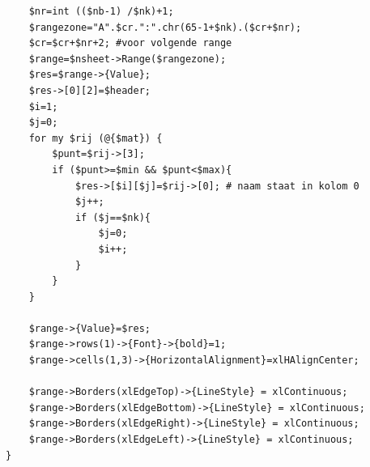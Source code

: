 \documentclass[11pt,a4paper]{report}
\begin{document}
\begin{enumerate}[resume]
\begin{lstlisting}
	$nr=int (($nb-1) /$nk)+1;
	$rangezone="A".$cr.":".chr(65-1+$nk).($cr+$nr);
	$cr=$cr+$nr+2; #voor volgende range
	$range=$nsheet->Range($rangezone);
	$res=$range->{Value};
	$res->[0][2]=$header;
	$i=1;
	$j=0;
	for my $rij (@{$mat}) {
		$punt=$rij->[3];
		if ($punt>=$min && $punt<$max){
			$res->[$i][$j]=$rij->[0]; # naam staat in kolom 0
			$j++;
			if ($j==$nk){
				$j=0;
				$i++;
			}
		}
	}
	
	$range->{Value}=$res;
	$range->rows(1)->{Font}->{bold}=1;
	$range->cells(1,3)->{HorizontalAlignment}=xlHAlignCenter;
	
	$range->Borders(xlEdgeTop)->{LineStyle} = xlContinuous;
	$range->Borders(xlEdgeBottom)->{LineStyle} = xlContinuous;
	$range->Borders(xlEdgeRight)->{LineStyle} = xlContinuous;
	$range->Borders(xlEdgeLeft)->{LineStyle} = xlContinuous;
}
\end{lstlisting}
\end{enumerate}
\end{document}
